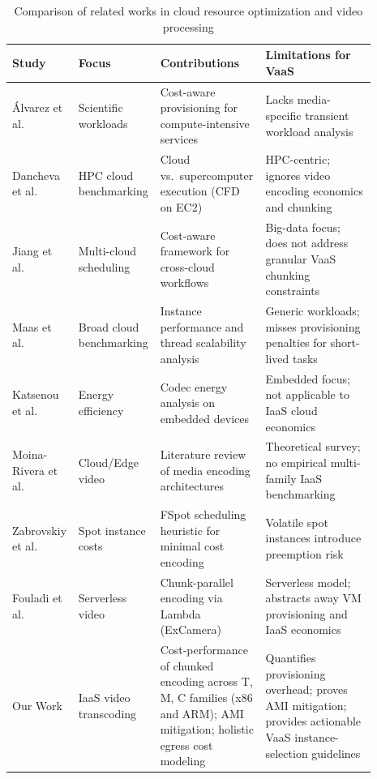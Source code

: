 \documentclass[conference]{IEEEtran}
\begin{document}
\begin{table}[!htbp]
	\centering
	\caption{Comparison of related works in cloud resource optimization and video processing}
	\label{tab:comparative_analysis}
	\begin{tabular}{|p{0.15\linewidth}|p{0.18\linewidth}|p{0.26\linewidth}|p{0.30\linewidth}|}
		\hline
		\textbf{Study} & \textbf{Focus} & \textbf{Contributions} & \textbf{Limitations for VaaS} \\
		\hline
		Álvarez et al. \cite{b2} & Scientific workloads & Cost-aware provisioning for compute-intensive services & Lacks media-specific transient workload analysis \\
		\hline
		Dancheva et al. \cite{b3} & HPC cloud benchmarking & Cloud vs.\ supercomputer execution (CFD on EC2) & HPC-centric; ignores video encoding economics and chunking \\
		\hline
		Jiang et al. \cite{b20} & Multi-cloud scheduling & Cost-aware framework for cross-cloud workflows & Big-data focus; does not address granular VaaS chunking constraints \\
		\hline
		Maas et al. \cite{b1,b23} & Broad cloud benchmarking & Instance performance and thread scalability analysis & Generic workloads; misses provisioning penalties for short-lived tasks \\
		\hline
		Katsenou et al. \cite{b8} & Energy efficiency & Codec energy analysis on embedded devices & Embedded focus; not applicable to IaaS cloud economics \\
		\hline
		Moina-Rivera et al. \cite{b22} & Cloud/Edge video & Literature review of media encoding architectures & Theoretical survey; no empirical multi-family IaaS benchmarking \\
		\hline
		Zabrovskiy et al. \cite{b21} & Spot instance costs & FSpot scheduling heuristic for minimal cost encoding & Volatile spot instances introduce preemption risk \\
		\hline
		Fouladi et al. \cite{excamera} & Serverless video & Chunk-parallel encoding via Lambda (ExCamera) & Serverless model; abstracts away VM provisioning and IaaS economics \\
		\hline
		Our Work & IaaS video transcoding & Cost-performance of chunked encoding across T, M, C families (x86 and ARM); AMI mitigation; holistic egress cost modeling & Quantifies provisioning overhead; proves AMI mitigation; provides actionable VaaS instance-selection guidelines \\
		\hline
	\end{tabular}
\end{table}
\end{document}
